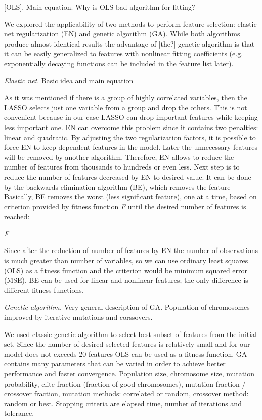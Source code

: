 \documentclass[aps,prl,reprint,amsmath,amssymb,nature]{revtex4-1}
\begin{document}
$[$OLS$]$. Main equation. Why is OLS bad algorithm for fitting?

We explored the applicability of two methods to perform feature 
selection: elastic net regularization (EN) and genetic algorithm (GA). 
While both algorithms produce almost identical results the advantage of 
$[$the?$]$ genetic algorithm is that it can be easily generalized to 
features with nonlinear fitting coefficients (e.g. exponentially 
decaying functions can be included in the feature list later).

\textit{Elastic net}. Basic idea and main equation

As it was mentioned if there is a group of highly correlated variables, 
then the LASSO selects just one variable from a group and drop the 
others. This is not convenient because in our case LASSO can drop 
important features while keeping less important one. EN can overcome 
this problem since it contains two penalties: linear and quadratic. By 
adjusting the two regularization factors, it is possible to force EN to 
keep dependent features in the model. Later the unnecessary features 
will be removed by another algorithm. Therefore, EN allows to reduce the 
number of features from thousands to hundreds or even less. Next step is 
to reduce the number of features decreased by EN to desired value. It 
can be done by the backwards elimination algorithm (BE), which removes 
the feature Basically, BE removes the worst (less significant feature), 
one at a time, based on criterion provided by fitness function \textit{
F} until the desired number of features is reached:

\textit{F = }

 Since after the reduction of number of features by EN the number of 
observations is much greater than number of variables, so we can use 
ordinary least squares (OLS) as a fitness function and the criterion 
would be minimum squared error (MSE). BE can be used for linear and 
nonlinear features; the only difference is different fitness functions.

\textit{Genetic algorithm.}\textbf{ }Very general description of GA. 
Population of chromosomes improved by iterative mutations and 
corssovers.

We used classic genetic algorithm to select best subset of features from 
the initial set. Since the number of desired selected features is 
relatively small and for our model does not exceeds 20 features OLS can 
be used as a fitness function. GA contains many parameters that can be 
varied in order to achieve better performance and faster convergence. 
Population size, chromosome size, mutation probability, elite fraction 
(fraction of good chromosomes), mutation fraction / crossover fraction, 
mutation methods: correlated or random, crossover method: random or 
best. Stopping criteria are elapsed time, number of iterations and 
tolerance. 
\end{document}
